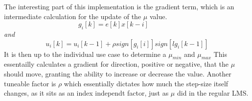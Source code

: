 The interesting part of this implementation is the gradient term, which
is an intermediate calculation for the update of the $\mu$ value.
\begin{equation}
g_i[k] = e[k]x[k-i] \qquad  \qquad 
\label{VSS_LMS_g}
\end{equation}
\textit{and}
\begin{equation}
u_i[k] = u_i[k-1] + \rho sign \left[g_i[i]\right]sign\left[lg_i[k-1]\right]
\label{VSS_LMS_mu_update}
\end{equation}
It is then up to the individual use case to determine a $\mu_{min}$ and $\mu_{max}$
This essentailly calculates a gradient for direction, positive or negative, that the $\mu$ should move, granting
the ability to increase or decrease the value. Another tuneable factor is $\rho$ which essentially dictates how much 
the step-size itself changes, as it sits as an index independt factor, just as $\mu$ did in the regular LMS.
